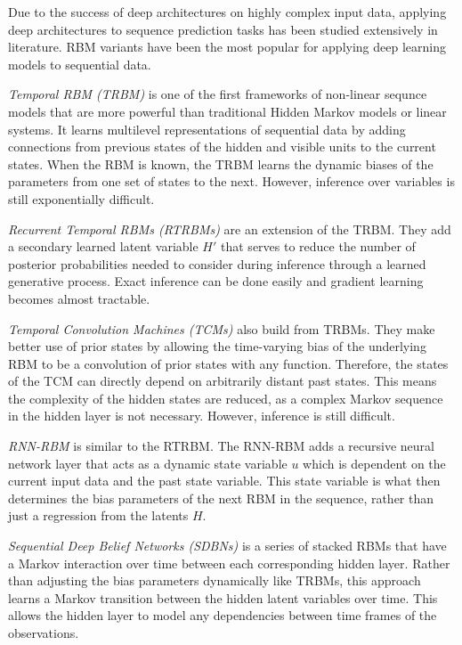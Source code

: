Due to the success of deep architectures on highly complex input data, applying deep architectures to sequence prediction tasks has been studied extensively in literature. RBM variants have been the most popular for applying deep learning models to sequential data.

\emph{Temporal RBM (TRBM)} \cite{sutskever06} is one of the first frameworks of non-linear sequnce models that are more powerful than traditional Hidden Markov models or linear systems. It learns multilevel representations of sequential data by adding connections from previous states of the hidden and visible units to the current states. When the RBM is known, the TRBM learns the dynamic biases of the parameters from one set of states to the next. However, inference over variables is still exponentially difficult.


\emph{Recurrent Temporal RBMs (RTRBMs)} \cite{sutskever08} are an extension of the TRBM. They add a secondary learned latent variable \(H'\) that serves to reduce the number of posterior probabilities needed to consider during inference through a learned generative process. Exact inference can be done easily and gradient learning becomes almost tractable.


\emph{Temporal Convolution Machines (TCMs)} \cite{lockett09} also build from TRBMs. They make better use of prior states by allowing the time-varying bias of the underlying RBM to be a convolution of prior states with any function. Therefore, the states of the TCM can directly depend on arbitrarily distant past states. This means the complexity of the hidden states are reduced, as a complex Markov sequence in the hidden layer is not necessary. However, inference is still difficult.


\emph{RNN-RBM} \cite{lewandowski12} is similar to the RTRBM. The RNN-RBM adds a recursive neural network layer that acts as a dynamic state variable \(u\) which is dependent on the current input data and the past state variable. This state variable is what then determines the bias parameters of the next RBM in the sequence, rather than just a regression from the latents \(H\).


\emph{Sequential Deep Belief Networks (SDBNs)} \cite{andrew12, andrew13}  is a series of stacked RBMs that have a Markov interaction over time between each corresponding hidden layer. Rather than adjusting the bias parameters dynamically like TRBMs, this approach learns a Markov transition between the hidden latent variables over time. This allows the hidden layer to model any dependencies between time frames of the observations.



